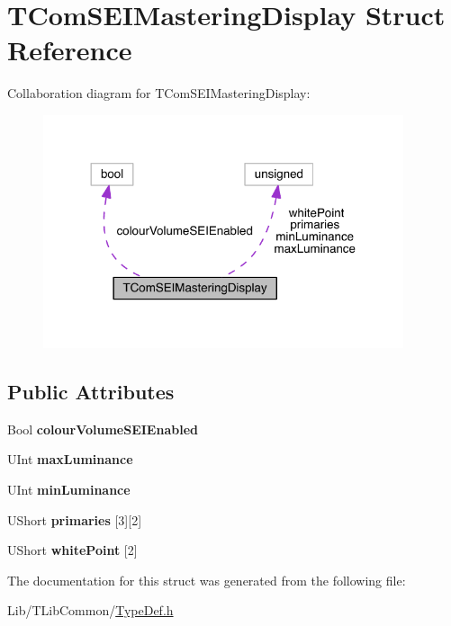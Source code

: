 \hypertarget{struct_t_com_s_e_i_mastering_display}{}\section{T\+Com\+S\+E\+I\+Mastering\+Display Struct Reference}
\label{struct_t_com_s_e_i_mastering_display}


Collaboration diagram for T\+Com\+S\+E\+I\+Mastering\+Display\+:
\nopagebreak
\begin{figure}[H]
\begin{center}
\leavevmode
\includegraphics[width=300pt]{d5/de4/struct_t_com_s_e_i_mastering_display__coll__graph}
\end{center}
\end{figure}
\subsection*{Public Attributes}
\begin{DoxyCompactItemize}
\item 
\mbox{\label{struct_t_com_s_e_i_mastering_display_a82f6d52f4115367f2e009fe3be6a9c34}} 
Bool {\bfseries colour\+Volume\+S\+E\+I\+Enabled}
\item 
\mbox{\label{struct_t_com_s_e_i_mastering_display_a37dcc85dd6b9ba194bf68639fc6bfc35}} 
U\+Int {\bfseries max\+Luminance}
\item 
\mbox{\label{struct_t_com_s_e_i_mastering_display_a9610cb60a943a14465c836e1ea4b75b6}} 
U\+Int {\bfseries min\+Luminance}
\item 
\mbox{\label{struct_t_com_s_e_i_mastering_display_aa3802dd1e852085e7844516c8748d568}} 
U\+Short {\bfseries primaries} \mbox{[}3\mbox{]}\mbox{[}2\mbox{]}
\item 
\mbox{\label{struct_t_com_s_e_i_mastering_display_af8496eed1ca03c06b661b3a2a085ff13}} 
U\+Short {\bfseries white\+Point} \mbox{[}2\mbox{]}
\end{DoxyCompactItemize}


The documentation for this struct was generated from the following file\+:\begin{DoxyCompactItemize}
\item 
Lib/\+T\+Lib\+Common/\hyperlink{_type_def_8h}{Type\+Def.\+h}\end{DoxyCompactItemize}

